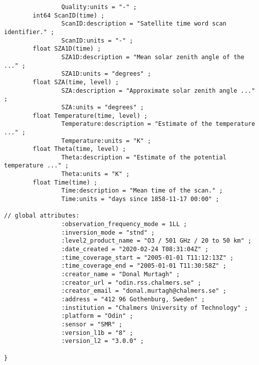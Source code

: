 \begin{verbatim}
                Quality:units = "-" ;
        int64 ScanID(time) ;
                ScanID:description = "Satellite time word scan identifier." ;
                ScanID:units = "-" ;
        float SZA1D(time) ;
                SZA1D:description = "Mean solar zenith angle of the ..." ;
                SZA1D:units = "degrees" ;
        float SZA(time, level) ;
                SZA:description = "Approximate solar zenith angle ..." ;
                SZA:units = "degrees" ;
        float Temperature(time, level) ;
                Temperature:description = "Estimate of the temperature ..." ;
                Temperature:units = "K" ;
        float Theta(time, level) ;
                Theta:description = "Estimate of the potential temperature ..." ;
                Theta:units = "K" ;
        float Time(time) ;
                Time:description = "Mean time of the scan." ;
                Time:units = "days since 1858-11-17 00:00" ;

// global attributes:
                :observation_frequency_mode = 1LL ;
                :inversion_mode = "stnd" ;
                :level2_product_name = "O3 / 501 GHz / 20 to 50 km" ;
                :date_created = "2020-02-24 T08:31:04Z" ;
                :time_coverage_start = "2005-01-01 T11:12:13Z" ;
                :time_coverage_end = "2005-01-01 T11:30:58Z" ;
                :creator_name = "Donal Murtagh" ;
                :creator_url = "odin.rss.chalmers.se" ;
                :creator_email = "donal.murtagh@chalmers.se" ;
                :address = "412 96 Gothenburg, Sweden" ;
                :institution = "Chalmers University of Technology" ;
                :platform = "Odin" ;
                :sensor = "SMR" ;
                :version_l1b = "8" ;
                :version_l2 = "3.0.0" ;

}
\end{verbatim}
